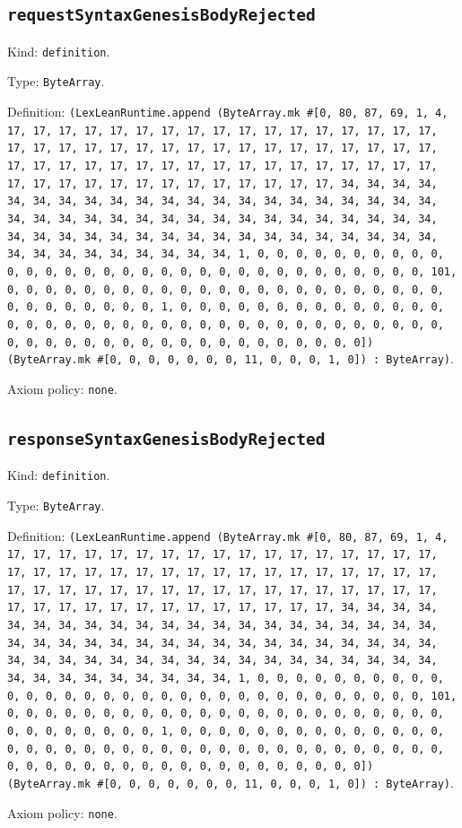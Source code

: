 \documentclass[11pt]{article}
\begin{document}
\subsection*{\texttt{requestSyntaxGenesisBodyRejected}}
\noindent Kind: \texttt{definition}.\par
\noindent Type: \texttt{ByteArray}.\par
\noindent Definition: \texttt{(LexLeanRuntime.append (ByteArray.mk \#[0, 80, 87, 69, 1, 4, 17, 17, 17, 17, 17, 17, 17, 17, 17, 17, 17, 17, 17, 17, 17, 17, 17, 17, 17, 17, 17, 17, 17, 17, 17, 17, 17, 17, 17, 17, 17, 17, 17, 17, 17, 17, 17, 17, 17, 17, 17, 17, 17, 17, 17, 17, 17, 17, 17, 17, 17, 17, 17, 17, 17, 17, 17, 17, 17, 17, 17, 17, 17, 17, 34, 34, 34, 34, 34, 34, 34, 34, 34, 34, 34, 34, 34, 34, 34, 34, 34, 34, 34, 34, 34, 34, 34, 34, 34, 34, 34, 34, 34, 34, 34, 34, 34, 34, 34, 34, 34, 34, 34, 34, 34, 34, 34, 34, 34, 34, 34, 34, 34, 34, 34, 34, 34, 34, 34, 34, 34, 34, 34, 34, 34, 34, 34, 34, 1, 0, 0, 0, 0, 0, 0, 0, 0, 0, 0, 0, 0, 0, 0, 0, 0, 0, 0, 0, 0, 0, 0, 0, 0, 0, 0, 0, 0, 0, 0, 0, 0, 101, 0, 0, 0, 0, 0, 0, 0, 0, 0, 0, 0, 0, 0, 0, 0, 0, 0, 0, 0, 0, 0, 0, 0, 0, 0, 0, 0, 0, 0, 0, 0, 1, 0, 0, 0, 0, 0, 0, 0, 0, 0, 0, 0, 0, 0, 0, 0, 0, 0, 0, 0, 0, 0, 0, 0, 0, 0, 0, 0, 0, 0, 0, 0, 0, 0, 0, 0, 0, 0, 0, 0, 0, 0, 0, 0, 0, 0, 0, 0, 0, 0, 0, 0, 0, 0, 0, 0, 0]) (ByteArray.mk \#[0, 0, 0, 0, 0, 0, 0, 11, 0, 0, 0, 1, 0]) : ByteArray)}.\par
\noindent Axiom policy: \texttt{none}.\par
\subsection*{\texttt{responseSyntaxGenesisBodyRejected}}
\noindent Kind: \texttt{definition}.\par
\noindent Type: \texttt{ByteArray}.\par
\noindent Definition: \texttt{(LexLeanRuntime.append (ByteArray.mk \#[0, 80, 87, 69, 1, 4, 17, 17, 17, 17, 17, 17, 17, 17, 17, 17, 17, 17, 17, 17, 17, 17, 17, 17, 17, 17, 17, 17, 17, 17, 17, 17, 17, 17, 17, 17, 17, 17, 17, 17, 17, 17, 17, 17, 17, 17, 17, 17, 17, 17, 17, 17, 17, 17, 17, 17, 17, 17, 17, 17, 17, 17, 17, 17, 17, 17, 17, 17, 17, 17, 34, 34, 34, 34, 34, 34, 34, 34, 34, 34, 34, 34, 34, 34, 34, 34, 34, 34, 34, 34, 34, 34, 34, 34, 34, 34, 34, 34, 34, 34, 34, 34, 34, 34, 34, 34, 34, 34, 34, 34, 34, 34, 34, 34, 34, 34, 34, 34, 34, 34, 34, 34, 34, 34, 34, 34, 34, 34, 34, 34, 34, 34, 34, 34, 1, 0, 0, 0, 0, 0, 0, 0, 0, 0, 0, 0, 0, 0, 0, 0, 0, 0, 0, 0, 0, 0, 0, 0, 0, 0, 0, 0, 0, 0, 0, 0, 0, 101, 0, 0, 0, 0, 0, 0, 0, 0, 0, 0, 0, 0, 0, 0, 0, 0, 0, 0, 0, 0, 0, 0, 0, 0, 0, 0, 0, 0, 0, 0, 0, 1, 0, 0, 0, 0, 0, 0, 0, 0, 0, 0, 0, 0, 0, 0, 0, 0, 0, 0, 0, 0, 0, 0, 0, 0, 0, 0, 0, 0, 0, 0, 0, 0, 0, 0, 0, 0, 0, 0, 0, 0, 0, 0, 0, 0, 0, 0, 0, 0, 0, 0, 0, 0, 0, 0, 0, 0]) (ByteArray.mk \#[0, 0, 0, 0, 0, 0, 0, 11, 0, 0, 0, 1, 0]) : ByteArray)}.\par
\noindent Axiom policy: \texttt{none}.\par
\end{document}
